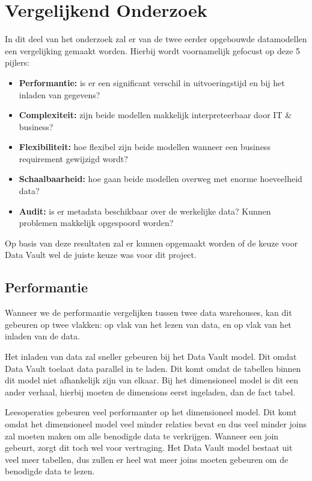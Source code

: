 
\chapter{Vergelijkend Onderzoek}
\label{ch:vergelijkendonderzoek}
In dit deel van het onderzoek zal er van de twee eerder opgebouwde datamodellen een vergelijking gemaakt worden. Hierbij wordt voornamelijk gefocust op deze 5 pijlers:

\begin{itemize}
	\item \textbf{Performantie:} is er een significant verschil in uitvoeringstijd en bij het inladen van gegevens?
	\item \textbf{Complexiteit:} zijn beide modellen makkelijk interpreteerbaar door IT \& business?
	\item \textbf{Flexibiliteit:} hoe flexibel zijn beide modellen wanneer een business requirement gewijzigd wordt?
	\item \textbf{Schaalbaarheid:} hoe gaan beide modellen overweg met enorme hoeveelheid data?
	\item \textbf{Audit:} is er metadata beschikbaar over de werkelijke data? Kunnen problemen makkelijk opgespoord worden?
\end{itemize} 

Op basis van deze resultaten zal er kunnen opgemaakt worden of de keuze voor Data Vault wel de juiste keuze was voor dit project.

\section{Performantie}
Wanneer we de performantie vergelijken tussen twee data warehouses, kan dit gebeuren op twee vlakken: op vlak van het lezen van data, en op vlak van het inladen van de data.

Het inladen van data zal sneller gebeuren bij het Data Vault model. Dit omdat Data Vault toelaat data parallel in te laden. Dit komt omdat de tabellen binnen dit model niet afhankelijk zijn van elkaar. Bij het dimensioneel model is dit een ander verhaal, hierbij moeten de dimensions eerst ingeladen, dan de fact tabel. 

Leesoperaties gebeuren veel performanter op het dimensioneel model. Dit komt omdat het dimensioneel model veel minder relaties bevat en dus veel minder joins zal moeten maken om alle benodigde data te verkrijgen. Wanneer een join gebeurt, zorgt dit toch wel voor vertraging. Het Data Vault model bestaat uit veel meer tabellen, dus zullen er heel wat meer joins moeten gebeuren om de benodigde data te lezen. 

